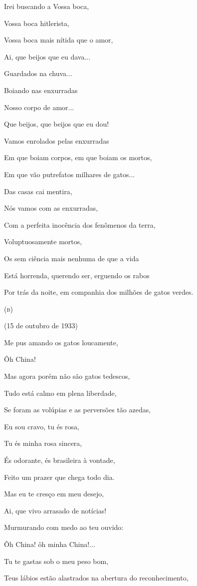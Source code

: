 Irei buscando a Vossa boca,

Vossa boca hitlerista,

Vossa boca mais nítida que o amor,

Ai, que beijos que eu dava...

Guardados na chuva...

Boiando nas enxurradas

Nosso corpo de amor...

Que beijos, que beijos que eu dou!

Vamos enrolados pelas enxurradas

Em que boiam corpos, em que boiam os mortos,

Em que vão putrefatos milhares de gatos...

Das casas cai mentira,

Nós vamos com as enxurradas,

Com a perfeita inocência dos fenômenos da terra,

Voluptuosamente mortos,

Os sem ciência mais nenhuma de que a vida

Está horrenda, querendo ser, erguendo os rabos

Por trás da noite, em companhia dos milhões de gatos verdes.

\textsc{(b)}

(15 de outubro de 1933)

Me pus amando os gatos loucamente,

Ôh China!

Mas agora porém não são gatos tedescos,

Tudo está calmo em plena liberdade,

Se foram as volúpias e as perversões tão azedas,

Eu sou cravo, tu és rosa,

Tu és minha rosa sincera,

És odorante, és brasileira à vontade,

Feito um prazer que chega todo dia.

Mas eu te cresço em meu desejo,

Ai, que vivo arrasado de notícias!

Murmurando com medo ao teu ouvido:

Ôh China! ôh minha China!...

Tu te gastas sob o meu peso bom,

Teus lábios estão alastrados na abertura do reconhecimento,

